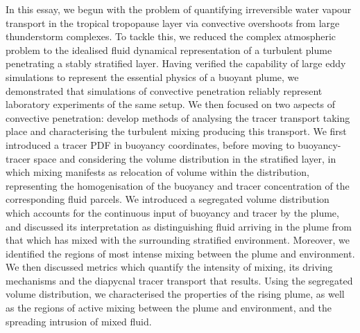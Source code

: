 \documentclass[a4paper]{article}
\begin{document}
In this essay, we begun with the problem of quantifying irreversible water vapour transport in the tropical
tropopause layer via convective overshoots from large thunderstorm complexes. To tackle this,
we reduced the complex atmospheric problem to the idealised fluid dynamical representation of a turbulent
plume penetrating a stably stratified layer. Having verified the capability of large eddy simulations to
represent the essential physics of a buoyant plume, we demonstrated that simulations of convective penetration
reliably represent laboratory experiments of the same setup. We then focused on two aspects of convective
penetration: develop methods of analysing the tracer transport taking place and characterising the turbulent
mixing producing this transport. We first introduced a tracer PDF in buoyancy coordinates, before moving to
buoyancy-tracer space and considering the volume distribution in the stratified layer, in which mixing
manifests as relocation of volume within the distribution, representing the homogenisation of the buoyancy and
tracer concentration of the corresponding fluid parcels. We introduced a segregated volume distribution which
accounts for the continuous input of buoyancy and tracer by the plume, and discussed its interpretation as
distinguishing fluid arriving in the plume from that which has mixed with the surrounding stratified
environment.  Moreover, we identified the regions of most intense mixing between the plume and
environment. We then discussed metrics which quantify the intensity of mixing, its driving mechanisms and the
diapycnal tracer transport that results. Using the segregated volume distribution, we characterised the
properties of the rising plume, as well as the regions of active mixing between the plume and environment, and
the spreading intrusion of mixed fluid. 
\end{document}
